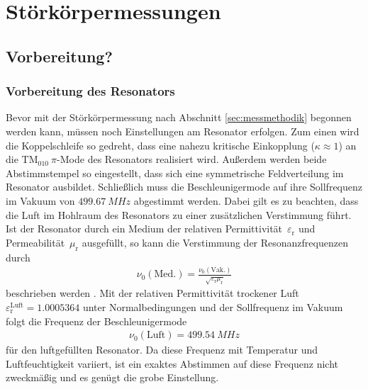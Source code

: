 \chapter{Störkörpermessungen}
\label{sec:stoerkoerpermessung}


\section{Vorbereitung?}

\subsection{Vorbereitung des Resonators}
Bevor mit der Störkörpermessung nach Abschnitt \ref{sec:messmethodik} begonnen werden kann, müssen noch Einstellungen am Resonator erfolgen.
Zum einen wird die Koppelschleife so gedreht, dass eine nahezu kritische Einkopplung ($\kappa \approx 1$) an die $\mathrm{TM}_{010}~\pi$-Mode des Resonators realisiert wird.
Außerdem werden beide Abstimmstempel so eingestellt, dass sich eine symmetrische Feldverteilung im Resonator ausbildet.
Schließlich muss die Beschleunigermode auf ihre Sollfrequenz im Vakuum von $\SI{499.67}{MHz}$ abgestimmt werden.
Dabei gilt es zu beachten, dass die Luft im Hohlraum des Resonators zu einer zusätzlichen Verstimmung führt.
Ist der Resonator durch ein Medium der relativen Permittivität~$\varepsilon_\mathrm{r}$ und Permeabilität~$\mu_\mathrm{r}$ ausgefüllt, so kann die Verstimmung der Resonanzfrequenzen durch
\begin{align}
	\nu_0(\mathrm{Med.}) = \frac{\nu_0(\mathrm{Vak.})}{\sqrt{\varepsilon_\mathrm{r} \mu_\mathrm{r}}}
\end{align}
beschrieben werden \cite{pusch}.
Mit der relativen Permittivität trockener Luft~$\varepsilon_\mathrm{r}^\mathrm{Luft} = \num{1.0005364}$ unter Normalbedingungen \cite[S.\ 1093]{CRC} und der Sollfrequenz im Vakuum folgt die Frequenz der Beschleunigermode
\begin{align}
	\nu_0(\mathrm{Luft}) = \SI{499.54}{MHz}
\end{align}
für den luftgefüllten Resonator.
Da diese Frequenz mit Temperatur und Luftfeuchtigkeit variiert, ist ein exaktes Abstimmen auf diese Frequenz nicht zweckmäßig und es genügt die grobe Einstellung.

